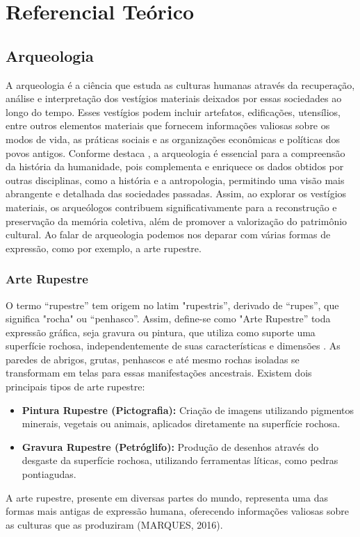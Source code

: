 \chapter{Referencial Teórico}
\label{Referencial_Teorico}

\section{Arqueologia}%
A arqueologia é a ciência que estuda as culturas humanas através da recuperação, análise e interpretação dos vestígios materiais deixados por essas sociedades ao longo do tempo. Esses vestígios podem incluir artefatos, edificações, utensílios, entre outros elementos materiais que fornecem informações valiosas sobre os modos de vida, as práticas sociais e as organizações econômicas e políticas dos povos antigos. Conforme destaca \cite{funari2024arqueologia}, a arqueologia é essencial para a compreensão da história da humanidade, pois complementa e enriquece os dados obtidos por outras disciplinas, como a história e a antropologia, permitindo uma visão mais abrangente e detalhada das sociedades passadas. Assim, ao explorar os vestígios materiais, os arqueólogos contribuem significativamente para a reconstrução e preservação da memória coletiva, além de promover a valorização do patrimônio cultural.
Ao falar de arqueologia podemos nos deparar com várias formas de expressão, como por exemplo, a arte rupestre.
\subsection{Arte Rupestre}



O termo “rupestre” tem origem no latim "rupestris”, derivado de “rupes”, que significa "rocha" ou “penhasco”. Assim, define-se como "Arte Rupestre” toda expressão gráfica, seja gravura ou pintura, que utiliza como suporte uma superfície rochosa, independentemente de suas características e dimensões \cite[p. 7]{pedroignacioschmitz_1984_arte}. As paredes de abrigos, grutas, penhascos e até mesmo rochas isoladas se transformam em telas para essas manifestações ancestrais.
Existem dois principais tipos de arte rupestre:
\begin{itemize}
\item \textbf{Pintura Rupestre (Pictografia):} Criação de imagens utilizando pigmentos minerais, vegetais ou animais, aplicados diretamente na superfície rochosa.
\item \textbf{Gravura Rupestre (Petróglifo):} Produção de desenhos através do desgaste da superfície rochosa, utilizando ferramentas líticas, como pedras pontiagudas.
\end{itemize}
A arte rupestre, presente em diversas partes do mundo, representa uma das formas mais antigas de expressão humana, oferecendo informações valiosas sobre as culturas que as produziram (MARQUES, 2016).

